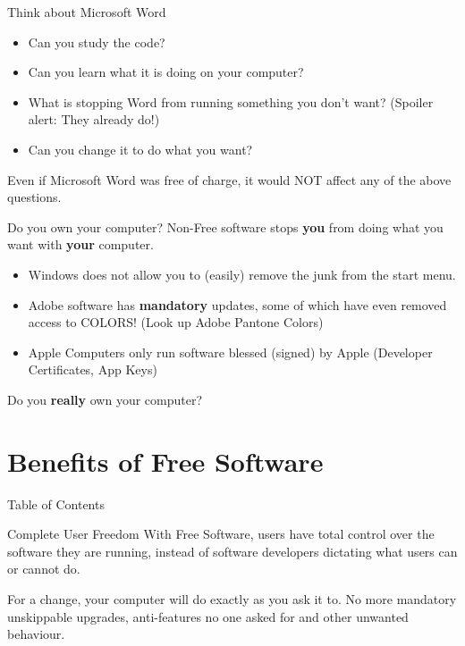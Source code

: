 \documentclass{beamer}
\begin{document}
\begin{frame}{Think about Microsoft Word}
	\pause
	\begin{itemize}
		\item Can you study the code?
			\pause
		\item Can you learn what it is doing on your computer?
			\pause
		\item What is stopping Word from running something you don't
			want? (Spoiler alert: They already do!)
			\pause
		\item Can you change it to do what you want?
			\pause
	\end{itemize}

	Even if Microsoft Word was free of charge, it would NOT affect any of
	the above questions.
\end{frame}

\begin{frame}{Do you own your computer?}
	Non-Free software stops \textbf{you} from doing what you want with
	\textbf{your} computer.
	
	\pause
	\begin{itemize}
		\item Windows does not allow you to (easily) remove the junk
			from the start menu.
			\pause
		\item Adobe software has \textbf{mandatory} updates, some of
			which have even removed access to COLORS! (Look up
			Adobe Pantone Colors)
			\pause
		\item Apple Computers only run software blessed (signed) by
			Apple (Developer Certificates, App Keys)
			\pause
	\end{itemize}

	Do you \textbf{really} own your computer?
\end{frame}

\section{Benefits of Free Software}
\begin{frame}{Table of Contents}
	\tableofcontents[currentsection]
\end{frame}

\begin{frame}{Complete User Freedom}
	With Free Software, users have total control over the software they are
	running, instead of software developers dictating what users can or
	cannot do.

	\pause

	For a change, your computer will do exactly as you ask it to. No more
	mandatory unskippable upgrades, anti-features no one asked for and
	other unwanted behaviour.
\end{frame}
\end{document}
